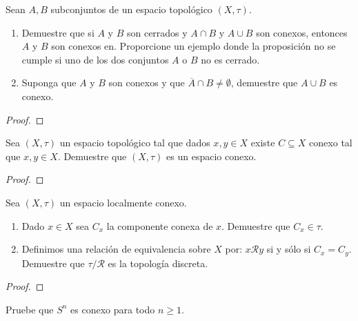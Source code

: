 \documentclass[12pt]{report}
\theoremstyle{largebreak}
\newcommand{\Cls}[1]{\ensuremath{\overline{#1}}}
\begin{document}
    \begin{excer}
        Sean $A,B$ subconjuntos de un espacio topológico $(X,\tau)$.
        \begin{enumerate}
            \item Demuestre que si $A$ y $B$ son cerrados y $A\cap B$ y $A\cup B$ son conexos, entonces $A$ y $B$ son conexos en. Proporcione un ejemplo donde la proposición no se cumple si uno de los dos conjuntos $A$ o $B$ no es cerrado.
            \item Suponga que $A$ y $B$ son conexos y que $\Cls{A}\cap B\neq\emptyset$, demuestre que $A\cup B$ es conexo.
        \end{enumerate}
    \end{excer}

    \begin{proof}
        
    \end{proof}

    \begin{excer}
        Sea $(X,\tau)$ un espacio topológico tal que dados $x,y\in X$ existe $C\subseteq X$ conexo tal que $x,y\in X$. Demuestre que $(X,\tau)$ es un espacio conexo.
    \end{excer}

    \begin{proof}
        
    \end{proof}

    \begin{excer}
        Sea $(X,\tau)$ un espacio localmente conexo.
        \begin{enumerate}
            \item Dado $x\in X$ sea $C_x$ la componente conexa de $x$. Demuestre que $C_x\in\tau$.
            \item Definimos una relación de equivalencia sobre $X$ por: $x\mathcal{R}y$ si y sólo si $C_x=C_y$. Demuestre que $\tau/\mathcal{R}$ es la topología discreta.
        \end{enumerate}
    \end{excer}

    \begin{proof}
        
    \end{proof}

    \begin{excer}
        Pruebe que $S^n$ es conexo para todo $n\geq1$.
    \end{excer}
\end{document}
